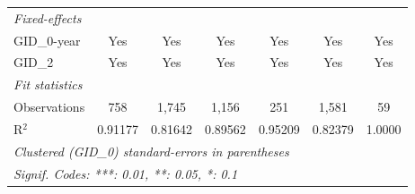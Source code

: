 \begin{table}[H]
\begin{tabular}{lcccccc}
      \midrule
      \emph{Fixed-effects}\\
      GID\_0-year                                          & Yes      & Yes           & Yes           & Yes           & Yes          & Yes\\  
      GID\_2                                               & Yes      & Yes           & Yes           & Yes           & Yes          & Yes\\  
      \midrule
      \emph{Fit statistics}\\
      Observations                                         & 758      & 1,745         & 1,156         & 251           & 1,581        & 59\\  
      R$^2$                                                & 0.91177  & 0.81642       & 0.89562       & 0.95209       & 0.82379      & 1.0000\\  
      \midrule \midrule
      \multicolumn{7}{l}{\emph{Clustered (GID\_0) standard-errors in parentheses}}\\
      \multicolumn{7}{l}{\emph{Signif. Codes: ***: 0.01, **: 0.05, *: 0.1}}\\
   \end{tabular}
\end{table}


